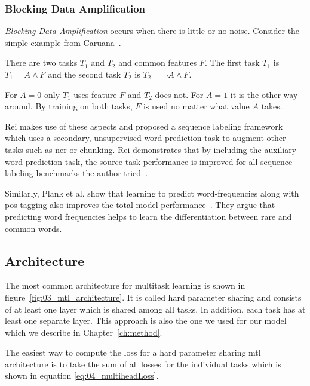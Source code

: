 \subsubsection*{Blocking Data Amplification}

\textit{Blocking Data Amplification} occurs when there is little or no noise. Consider the simple example from Caruana~\cite{Caruana1995a}.

There are two tasks $T_1$ and $T_2$ and common features $F$. The first task $T_1$ is $T_1 = A \land F $ and the second task $T_2$ is $T_2 = \neg A \land F$. 

For $A=0$ only $T_1$ uses feature $F$ and $T_2$ does not. For $A=1$ it is the other way around. By training on both tasks, $F$ is used no matter what value $A$ takes. 
\medskip

Rei makes use of these aspects and proposed a sequence labeling framework which uses a secondary, unsupervised word prediction task to augment other tasks such as \gls{ner} or chunking. Rei demonstrates that by including the auxiliary word prediction task, the source task performance is improved for all sequence labeling benchmarks the author tried~\cite{Rei2017}.
\medskip

Similarly, Plank et al. show that learning to predict word-frequencies along with \gls{pos}-tagging also improves the total model performance~\cite{Plank}. They argue that predicting word frequencies helps to learn the differentiation between rare and common words.


\subsection{Architecture}
The most common architecture for multitask learning is shown in figure~\ref{fig:03_mtl_architecture}. It is called hard parameter sharing and consists of at least one layer which is shared among all tasks. In addition, each task has at least one separate layer. This approach is also the one we used for our model which we describe in Chapter~\ref{ch:method}. 

The easiest way to compute the loss for a hard parameter sharing \gls{mtl} architecture is to take the sum of all losses for the individual tasks which is shown in equation \ref{eq:04_multiheadLoss}.

